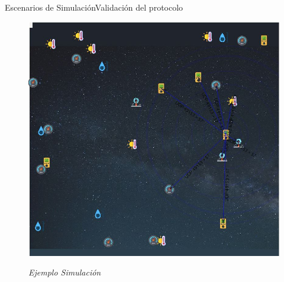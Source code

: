 \begin{frame}{Escenarios de Simulación}{Validación del protocolo}
	\centering
	\begin{figure}
    {\includegraphics[height=0.75\textheight,keepaspectratio]{Figures/Sim.JPG}}
    \caption{\small \sl Ejemplo Simulación}
	\label{figure:EjemploSim}
	\end{figure}
\end{frame}

